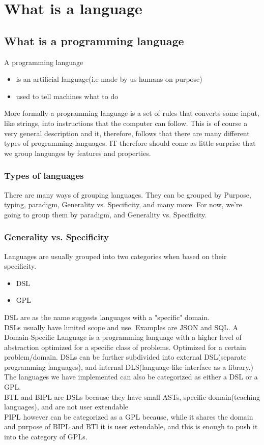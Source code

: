 \vfill
\chapter{What is a language}
\section{What is a programming language}
    A programming language 
    \begin{itemize}
        \item is an artificial language(i.e made by us humans on purpose)
        \item used to tell machines what to do
    \end{itemize}
    More formally a programming language is a set of rules that converts some input, like strings, into instructions that the computer can follow.
    This is of course a very general description and it, therefore, follows that there are many different types of programming languages.
    IT therefore should come as little surprise that we group languages by features and properties. 

    \subsection*{Types of languages}
    There are many ways of grouping languages. They can be grouped by Purpose, typing, paradigm, Generality vs. Specificity, and many more.
    For now, we're going to group them by paradigm, and Generality vs. Specificity.

    \subsection*{Generality vs. Specificity}
    Languages are usually grouped into two categories when based on their specificity.
    \begin{itemize}
        \item DSL
        \item GPL
    \end{itemize}
    
    \Gls{DSL} are as the name suggests languages with a "specific" domain.\\
    DSLs usually have limited scope and use. Examples are JSON and SQL.     
    A Domain-Specific Language is a programming language with a higher level of abstraction optimized for a specific class of problems. 
    Optimized for a certain problem/domain. 
    DSLs can be further subdivided into external DSL(separate programming languages), and internal DLS(language-like interface as a library.)\\
    The languages we have implemented can also be categorized as either a DSL or a GPL.\\
    \Gls{BTL} and \gls{BIPL} are DSLs because they have small ASTs, specific domain(teaching languages), and are not user extendable \\
    \Gls{PIPL} however can be categorized as a GPL because, while it shares the domain and purpose of BIPL and BTl it is user extendable, and this is enough to push it into the category of GPLs.\\

